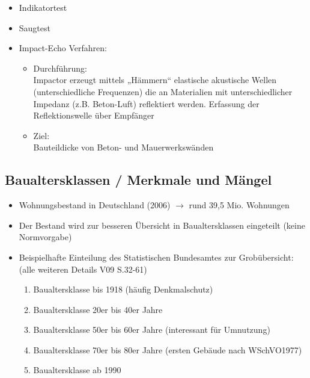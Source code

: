 \documentclass[fleqn,twoside,dvipsnames]{article}
\begin{document}
\begin{itemize}
\begin{itemize}
                    \item Indikatortest
                    \item Saugtest
                    \item Impact-Echo Verfahren:\label{Impact-Echo}
                        \begin{itemize}
                            \item Durchführung:\\
                            Impactor erzeugt mittels „Hämmern“ elastische
                            akustische Wellen (unterschiedliche Frequenzen)
                            die an Materialien mit unterschiedlicher
                            Impedanz (z.B. Beton-Luft) reflektiert werden.
                            Erfassung der Reflektionswelle über Empfänger
                            \item Ziel:\\
                            Bauteildicke von Beton- und Mauerwerkswänden
                        \end{itemize}
              \end{itemize}
        \end{itemize}
        
    \subsection{Baualtersklassen / Merkmale und Mängel} \label{Baualtersklassen}
        \begin{itemize}
            \item Wohnungsbestand in Deutschland (2006) $\rightarrow$ rund 39,5 Mio. Wohnungen
            \item Der Bestand wird zur besseren Übersicht in Baualtersklassen eingeteilt (keine Normvorgabe)
            \item Beispielhafte Einteilung des Statistischen Bundesamtes zur Grobübersicht: \\
                (alle weiteren Details V09 S.32-61)
                \begin{enumerate}
                    \item Baualtersklasse bis 1918 (häufig Denkmalschutz)
                    \item Baualtersklasse 20er bis 40er Jahre
                    \item Baualtersklasse 50er bis 60er Jahre (interessant für Umnutzung)
                    \item Baualtersklasse 70er bis 80er Jahre (ersten Gebäude nach WSchVO1977)
                    \item Baualtersklasse ab 1990
                \end{enumerate}
        \end{itemize}
\end{document}
